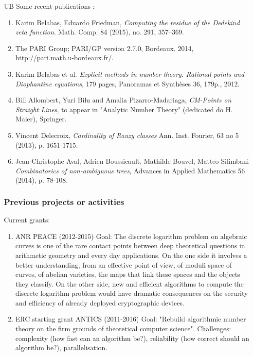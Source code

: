 \begin{sitedescription}{UB}
Some recent publications :
\begin{enumerate}
\item 
Karim Belabas, Eduardo Friedman,
\textit{Computing the residue of the Dedekind zeta function}.
Math. Comp. 84 (2015), no. 291, 357–369. 

\item
The PARI Group; PARI/GP version 2.7.0, Bordeaux, 2014,
http://pari.math.u-bordeaux.fr/.

\item
Karim Belabas et al.
\textit{Explicit methods in number theory. Rational points and Diophantine equations},
179 pages, Panoramas et Synthèses 36, 179p., 2012.

\item
Bill Allombert, Yuri Bilu and Amalia Pizarro-Madariaga,
\textit{CM-Points on Straight Lines}, to appear in "Analytic Number Theory" (dedicated do H. Maier),
Springer.

\item
Vincent Delecroix,
\textit{Cardinality of Rauzy classes}
Ann. Inst. Fourier, 63 no 5 (2013), p. 1651-1715.

\item
Jean-Christophe Aval, Adrien Boussicault, Mathilde Bouvel, Matteo Silimbani
\textit{Combinatorics of non-ambiguous trees},
Advances in Applied Mathematics 56 (2014), p. 78-108.
\end{enumerate}

\subsubsection*{Previous projects or activities}

Current grants:
\begin{enumerate}
\item
 ANR PEACE (2012-2015)
    Goal: The discrete logarithm problem on algebraic curves is one of the rare
    contact points between deep theoretical questions in arithmetic geometry and
    every day applications. On the one side it involves a better understanding,
    from an effective point of view, of moduli space of curves, of abelian
    varieties, the maps that link these spaces and the objects they classify.
    On the other side, new and efficient algorithms to compute the discrete
    logarithm problem would have dramatic consequences on the security and
    efficiency of already deployed cryptographic devices. 

\item
ERC starting grant ANTICS (2011-2016) 
    Goal: "Rebuild algorithmic number theory on the firm grounds of theoretical
    computer science".
    Challenges: complexity (how fast can an algorithm be?), reliability
    (how correct should an algorithm be?), parallelisation.
\end{enumerate}


\end{sitedescription}
